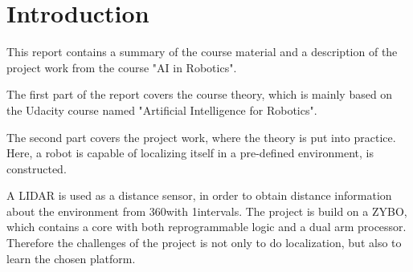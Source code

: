 \documentclass[Main]{subfiles}
\begin{document}
\chapter{Introduction} %
\label{cha:introduction}

This report contains a summary of the course material and a description of the project work from the course "AI in Robotics".

The first part of the report covers the course theory, which is mainly based on the Udacity course named "Artificial Intelligence for Robotics".

The second part covers the project work, where the theory is put into practice.
Here, a robot is capable of localizing itself in a pre-defined environment, is constructed.

A LIDAR is used as a distance sensor, in order to obtain distance information about the environment from 360\degree with 1\degree intervals.
The project is build on a ZYBO, which contains a core with both reprogrammable logic and a dual arm processor.
Therefore the challenges of the project is not only to do localization, but also to learn the chosen platform.

\end{document}
